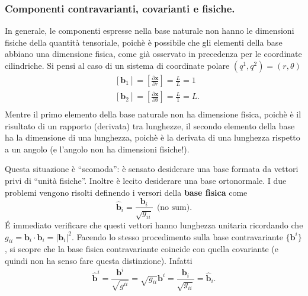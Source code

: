 \subsubsection{Componenti contravarianti, covarianti e fisiche.}
 In generale, le componenti espresse nella base naturale non hanno le dimensioni fisiche della 
 quantità tensoriale, poichè è possibile che gli elementi della base abbiano una dimensione fisica, come già osservato in precedenza per le coordinate cilindriche.
 Si pensi al caso di un sistema di coordinate polare $(q^1,q^2) = (r,\theta)$
 \begin{equation}
 \begin{aligned}
  & \left[ \bm{b}_1 \right] = \left[ \frac{\partial \bm{x}}{\partial r} \right] = \frac{L}{L} = 1 \\
  & \left[ \bm{b}_2 \right] = \left[ \frac{\partial \bm{x}}{\partial \theta} \right] = \frac{L}{1} = L . \\
 \end{aligned}
 \end{equation}
 Mentre il primo elemento della base naturale non ha dimensione fisica, poichè è il risultato di un rapporto (derivata) tra lunghezze,
 il secondo elemento della base ha la dimensione di una lunghezza, poichè è la derivata di una lunghezza rispetto a un angolo
 (e l'angolo non ha dimensioni fisiche!).
 
 Questa situazione è ``scomoda'': è sensato desiderare una base formata da vettori privi di ``unità fisiche''. Inoltre
 è lecito desiderare una base ortonormale. I due problemi vengono risolti definendo i versori della \textbf{base fisica} come
 \begin{equation}
  \bm{\hat{b}}_i = \dfrac{\bm{b}_i}{\sqrt{g_{ii}}} \ \ \text{(no sum)} .
 \end{equation}
 \'E immediato verificare che questi vettori hanno lunghezza unitaria ricordando che $g_{ii} = \bm{b}_i \cdot \bm{b}_i = |\bm{b}_i|^2$. Facendo lo stesso procedimento sulla base contravariante $\{ \bm{b}^i\}$, si scopre che la base fisica contravariante coincide con quella covariante (e quindi non ha senso fare questa distinzione). Infatti
  \begin{equation}\label{eqn:baseFisica}
  \bm{\hat{b}}^i = \dfrac{\bm{b}^i}{\sqrt{g^{ii}}} = \sqrt{g_{ii}} \bm{b}^i = \dfrac{\bm{b}_i}{\sqrt{g_{ii}}} = \bm{\hat{b}}_i .
 \end{equation}
 
